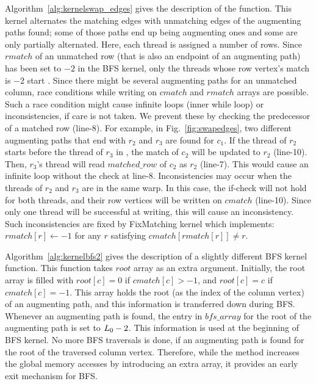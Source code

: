 \documentclass[11pt,a4paper]{article}
\newcommand{\st}{{\sc L_0}\xspace}
\newcommand{\fixinconsistent}{{\sc FixMatching}\xspace}
\newcommand{\altswap}{{\sc{Alternate}}\xspace}
\begin{document}
Algorithm~\ref{alg:kernelswap_edges} gives the description of the \altswap function. This kernel 
alternates the matching edges with unmatching edges of the augmenting paths found; some of those paths end up being augmenting ones and some are only partially alternated.
Here, each thread is assigned a number of rows. Since $rmatch$ of an unmatched row 
(that is also an endpoint of an augmenting path) has been set to $-2$ in the BFS kernel, 
only the threads whose row vertex's match
is $-2$ start \altswap. Since there might be 
several augmenting paths for an unmatched
column, race conditions while writing on
$cmatch$ and $rmatch$ arrays are possible. Such a race condition might cause
infinite loops (inner while loop) or inconsistencies, if care is not taken.  
We prevent these by checking the predecessor of a matched row 
(line-8). For example, in Fig.~\ref{fig:swapedges},
two different
augmenting paths that end with $r_2$ and $r_3$ are found for $c_1$. If the thread
of $r_2$ starts before the thread of $r_3$ in \altswap, the match of $c_2$ will be updated
to $r_2$ (line-10). Then, $r_3$'s thread will read $matched\_row$ of $c_2$
as $r_2$ (line-7). This would cause an infinite loop
without the check at line-8. Inconsistencies may occur when the
threads of $r_2$ and $r_3$ are in the same warp. In this case, 
the if-check will not hold for both threads, and their row vertices will
be written on $cmatch$ (line-10).
Since only one thread will be successful at writing, 
this will cause an inconsistency. Such inconsistencies are fixed
by \fixinconsistent{} kernel which implements: $\mbox {$rmatch[r] \gets -1$}$ for any $r$ satisfying $cmatch[rmatch[r]] \neq r$.



Algorithm~\ref{alg:kernelbfs2} gives the description of a slightly different BFS kernel function.  
This function takes $root$ array as an extra argument. Initially, the root array
is filled with $root[c] = 0$ if $cmatch[c] > -1$, and $root[c] = c$ if $cmatch[c] = -1$.
This array holds the root (as the index of the column vertex) of an augmenting path, and this information is 
transferred down during BFS. Whenever an augmenting path is found, the entry in 
$bfs\_array$ for the root of the augmenting path is set to $\st{}-2$. 
This information is used at the beginning of BFS kernel. No more BFS traversals is done,
if an augmenting path is found for the root of the traversed column vertex. Therefore,
while the method increases the global memory accesses by introducing 
an extra array, it provides an early exit mechanism for BFS. 
\end{document}
